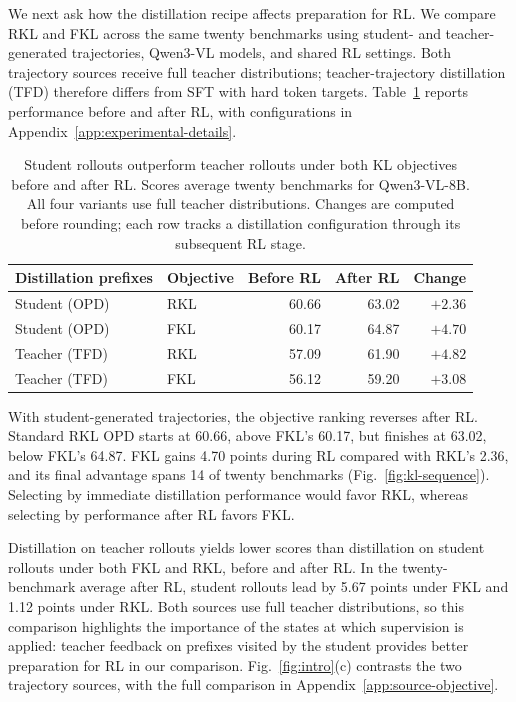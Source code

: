 \documentclass[]{jingdong}
\theoremstyle{plain}
\theoremstyle{definition}
\theoremstyle{remark}
\begin{document}
We next ask how the distillation recipe affects preparation for RL. We compare RKL and FKL across the same twenty benchmarks using student- and teacher-generated trajectories, Qwen3-VL models, and shared RL settings. Both trajectory sources receive full teacher distributions; teacher-trajectory distillation (TFD) therefore differs from SFT with hard token targets. Table~\ref{tab:interventions} reports performance before and after RL, with configurations in Appendix~\ref{app:experimental-details}.

\begin{table}[t]
\centering
\small
\caption{Student rollouts outperform teacher rollouts under both KL objectives before and after RL. Scores average twenty benchmarks for Qwen3-VL-8B. All four variants use full teacher distributions. Changes are computed before rounding; each row tracks a distillation configuration through its subsequent RL stage.}
\label{tab:interventions}
\setlength{\tabcolsep}{4pt}
\begin{tabular*}{\linewidth}{@{\extracolsep{\fill}}llrrr@{}}
\toprule
Distillation prefixes & Objective & Before RL & After RL & Change \\
\midrule
Student (OPD) & RKL & 60.66 & 63.02 & $+2.36$ \\
Student (OPD) & FKL & 60.17 & 64.87 & $+4.70$ \\
\midrule
Teacher (TFD) & RKL & 57.09 & 61.90 & $+4.82$ \\
Teacher (TFD) & FKL & 56.12 & 59.20 & $+3.08$ \\
\bottomrule
\end{tabular*}
\end{table}

With student-generated trajectories, the objective ranking reverses after RL. Standard RKL OPD starts at 60.66, above FKL's 60.17, but finishes at 63.02, below FKL's 64.87. FKL gains 4.70 points during RL compared with RKL's 2.36, and its final advantage spans 14 of twenty benchmarks (Fig.~\ref{fig:kl-sequence}). Selecting by immediate distillation performance would favor RKL, whereas selecting by performance after RL favors FKL.

Distillation on teacher rollouts yields lower scores than distillation on student rollouts under both FKL and RKL, before and after RL. In the twenty-benchmark average after RL, student rollouts lead by 5.67 points under FKL and 1.12 points under RKL. Both sources use full teacher distributions, so this comparison highlights the importance of the states at which supervision is applied: teacher feedback on prefixes visited by the student provides better preparation for RL in our comparison. Fig.~\ref{fig:intro}(c) contrasts the two trajectory sources, with the full comparison in Appendix~\ref{app:source-objective}.
\end{document}
